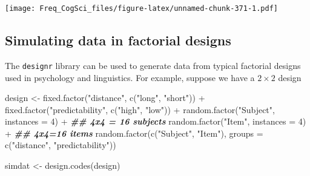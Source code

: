 \documentclass[
  12pt,
]{krantz}
\newenvironment{Shaded}{\begin{snugshade}}{\end{snugshade}}
\newcommand{\AttributeTok}[1]{\textcolor[rgb]{0.77,0.63,0.00}{#1}}
\newcommand{\ConstantTok}[1]{\textcolor[rgb]{0.00,0.00,0.00}{#1}}
\newcommand{\ControlFlowTok}[1]{\textcolor[rgb]{0.13,0.29,0.53}{\textbf{#1}}}
\newcommand{\DecValTok}[1]{\textcolor[rgb]{0.00,0.00,0.81}{#1}}
\newcommand{\DocumentationTok}[1]{\textcolor[rgb]{0.56,0.35,0.01}{\textbf{\textit{#1}}}}
\newcommand{\FloatTok}[1]{\textcolor[rgb]{0.00,0.00,0.81}{#1}}
\newcommand{\FunctionTok}[1]{\textcolor[rgb]{0.00,0.00,0.00}{#1}}
\newcommand{\NormalTok}[1]{#1}
\newcommand{\OtherTok}[1]{\textcolor[rgb]{0.56,0.35,0.01}{#1}}
\newcommand{\SpecialCharTok}[1]{\textcolor[rgb]{0.00,0.00,0.00}{#1}}
\newcommand{\StringTok}[1]{\textcolor[rgb]{0.31,0.60,0.02}{#1}}
\theoremstyle{definition}
\theoremstyle{definition}
\theoremstyle{definition}
\theoremstyle{definition}
\theoremstyle{remark}
\begin{document}
\begin{Shaded}
\end{Shaded}

\texttt{[image: Freq\_CogSci\_files/figure-latex/unnamed-chunk-371-1.pdf]}

\hypertarget{simulating-data-in-factorial-designs}{%
\subsection{Simulating data in factorial designs}\label{simulating-data-in-factorial-designs}}

The \texttt{designr} library can be used to generate data from typical factorial designs used in psychology and linguistics. For example, suppose we have a \(2\times 2\) design

\begin{Shaded}
\begin{Highlighting}[]
\NormalTok{design }\OtherTok{\textless{}{-}} \FunctionTok{fixed.factor}\NormalTok{(}\StringTok{"distance"}\NormalTok{, }\FunctionTok{c}\NormalTok{(}\StringTok{"long"}\NormalTok{, }\StringTok{"short"}\NormalTok{)) }\SpecialCharTok{+}
  \FunctionTok{fixed.factor}\NormalTok{(}\StringTok{"predictability"}\NormalTok{, }\FunctionTok{c}\NormalTok{(}\StringTok{"high"}\NormalTok{, }\StringTok{"low"}\NormalTok{)) }\SpecialCharTok{+}
  \FunctionTok{random.factor}\NormalTok{(}\StringTok{"Subject"}\NormalTok{, }\AttributeTok{instances =} \DecValTok{4}\NormalTok{) }\SpecialCharTok{+} \DocumentationTok{\#\# 4x4 = 16 subjects}
  \FunctionTok{random.factor}\NormalTok{(}\StringTok{"Item"}\NormalTok{, }\AttributeTok{instances =} \DecValTok{4}\NormalTok{) }\SpecialCharTok{+} \DocumentationTok{\#\# 4x4=16 items}
  \FunctionTok{random.factor}\NormalTok{(}\FunctionTok{c}\NormalTok{(}\StringTok{"Subject"}\NormalTok{, }\StringTok{"Item"}\NormalTok{), }\AttributeTok{groups =} \FunctionTok{c}\NormalTok{(}\StringTok{"distance"}\NormalTok{, }\StringTok{"predictability"}\NormalTok{))}

\NormalTok{simdat }\OtherTok{\textless{}{-}} \FunctionTok{design.codes}\NormalTok{(design)}
\end{Highlighting}
\end{Shaded}
\end{document}
